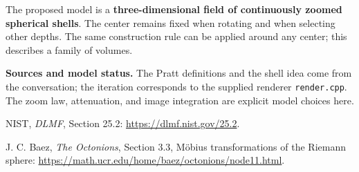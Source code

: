 \documentclass[11pt,a4paper]{article}
\numberwithin{equation}{section}
\begin{document}
\begin{modelbox}
The proposed model is a \textbf{three-dimensional field of continuously zoomed
spherical shells}. The center remains fixed when rotating and when selecting other
depths. The same construction rule can be applied around any center; this describes
a family of volumes.
\end{modelbox}

{\footnotesize\color{muted}
\textbf{Sources and model status.}
The Pratt definitions and the shell idea come from the conversation;
the iteration corresponds to the supplied renderer \texttt{render.cpp}.
The zoom law, attenuation, and image integration are explicit model choices here.\par
[1] NIST, \emph{DLMF}, Section 25.2: \url{https://dlmf.nist.gov/25.2}.\par
[2] J. C. Baez, \emph{The Octonions}, Section 3.3, Möbius transformations
of the Riemann sphere:
\url{https://math.ucr.edu/home/baez/octonions/node11.html}.
}
\end{document}
